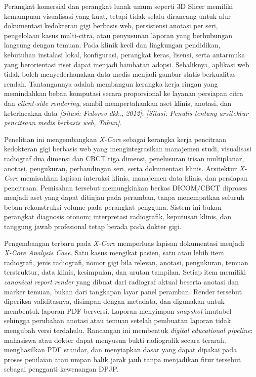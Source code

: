 \documentclass[12pt,a4paper,oneside]{report}
\newcommand{\sitasi}[1]{\textit{[Sitasi: #1]}}
\newcommand{\xcore}{\textit{X-Core}}
\begin{document}
Perangkat komersial dan perangkat lunak umum seperti 3D Slicer memiliki kemampuan visualisasi yang kuat, tetapi tidak selalu dirancang untuk alur dokumentasi kedokteran gigi berbasis web, persistensi anotasi per seri, pengelolaan kasus multi-citra, atau penyusunan laporan yang berhubungan langsung dengan temuan. Pada klinik kecil dan lingkungan pendidikan, kebutuhan instalasi lokal, konfigurasi, perangkat keras, lisensi, serta antarmuka yang berorientasi riset dapat menjadi hambatan adopsi. Sebaliknya, aplikasi web tidak boleh menyederhanakan data medis menjadi gambar statis berkualitas rendah. Tantangannya adalah membangun kerangka kerja ringan yang memindahkan beban komputasi secara proporsional ke layanan persiapan citra dan \textit{client-side rendering}, sambil mempertahankan aset klinis, anotasi, dan keterlacakan data \sitasi{Fedorov dkk., 2012}; \sitasi{Penulis tentang arsitektur pencitraan medis berbasis web, Tahun}.

Penelitian ini mengembangkan \xcore{} sebagai kerangka kerja pencitraan kedokteran gigi berbasis web yang mengintegrasikan manajemen studi, visualisasi radiograf dua dimensi dan CBCT tiga dimensi, penelusuran irisan multiplanar, anotasi, pengukuran, perbandingan seri, serta dokumentasi klinis. Arsitektur \xcore{} memisahkan lapisan interaksi klinis, manajemen data klinis, dan persiapan pencitraan. Pemisahan tersebut memungkinkan berkas DICOM/CBCT diproses menjadi aset yang dapat ditinjau pada peramban, tanpa menempatkan seluruh beban rekonstruksi volume pada perangkat pengguna. Sistem ini bukan perangkat diagnosis otonom; interpretasi radiografik, keputusan klinis, dan tanggung jawab profesional tetap berada pada dokter gigi.

Pengembangan terbaru pada \xcore{} memperluas lapisan dokumentasi menjadi \textit{X-Core Analysis Case}. Satu kasus mengikat pasien, satu atau lebih item radiografi, jenis radiografi, nomor gigi bila relevan, anotasi, pengukuran, temuan terstruktur, data klinis, kesimpulan, dan urutan tampilan. Setiap item memiliki \textit{canonical report render} yang dibuat dari radiograf aktual beserta anotasi dan marker temuan, bukan dari tangkapan layar panel peramban. Render tersebut diperiksa validitasnya, disimpan dengan metadata, dan digunakan untuk membentuk laporan PDF berversi. Laporan menyimpan \textit{snapshot} imutabel sehingga perubahan anotasi atau temuan setelah pembuatan laporan tidak mengubah versi terdahulu. Rancangan ini membentuk \textit{digital educational pipeline}: mahasiswa atau dokter dapat menyusun bukti radiografik secara terarah, menghasilkan PDF standar, dan menyiapkan dasar yang dapat dipakai pada proses penilaian atau umpan balik jarak jauh tanpa menjadikan fitur tersebut sebagai pengganti kewenangan DPJP.
\end{document}
